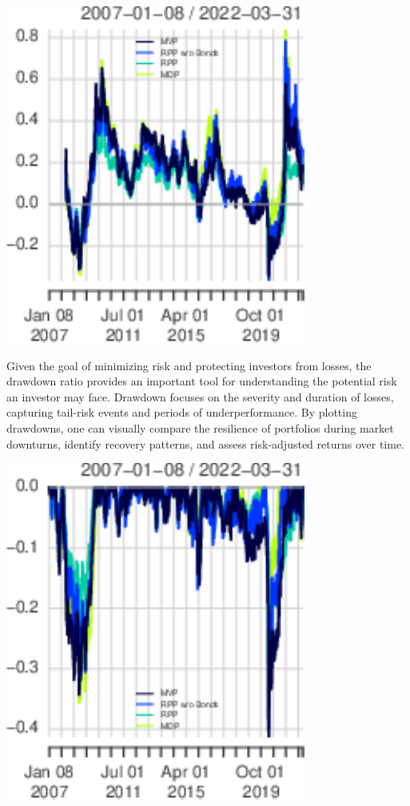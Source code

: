 \documentclass[11pt,preprint]{elsarticle}
\let\origfigure\figure
\let\endorigfigure\endfigure
\renewenvironment{figure}[1][2] {
    \expandafter\origfigure\expandafter[H]
} {
    \endorigfigure
}
\numberwithin{equation}{section}
\numberwithin{figure}{section}
\numberwithin{table}{section}
\begin{document}
\begin{figure}[H]

{\centering \includegraphics{Essay_files/figure-latex/Figure2-1} 

}

\caption{Annualized rolling returns \label{Figure2}}\label{fig:Figure2}
\end{figure}

Given the goal of minimizing risk and protecting investors from losses,
the drawdown ratio provides an important tool for understanding the
potential risk an investor may face. Drawdown focuses on the severity
and duration of losses, capturing tail-risk events and periods of
underperformance. By plotting drawdowns, one can visually compare the
resilience of portfolios during market downturns, identify recovery
patterns, and assess risk-adjusted returns over time.

\begin{figure}[H]

{\centering \includegraphics{Essay_files/figure-latex/Figure3-1} 

}

\caption{Drawdowns \label{Figure3}}\label{fig:Figure3}
\end{figure}
\end{document}
